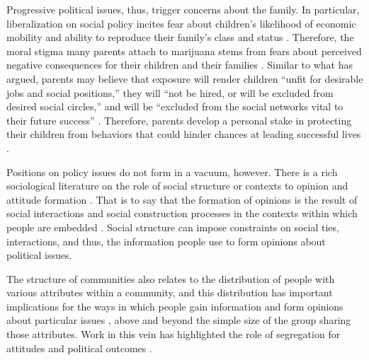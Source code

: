 Progressive political issues, thus, trigger concerns about the family. In particular, liberalization on social policy incites fear about children's likelihood of economic mobility and ability to reproduce their family's class and status \citep{beisel_1997,gusfield_1963,eskridge_and_speadle_2006}. Therefore, the moral stigma many parents attach to marijuana stems from fears about perceived negative consequences for their children and their families \citep{elder_and_greene_2019,lynskey_and_hall_2000,kandel_et_al_1986,lifrak_et_al_1997,fergusson_et_al_2002,kandel_2002,rosenthal_and_kubby_1996}. Similar to what \citet[5]{beisel_1997} has argued, parents may believe that exposure will render children ``unfit for desirable jobs and social positions,'' they will ``not be hired, or will be excluded from desired social circles,'' and will be ``excluded from the social networks vital to their future success'' \citep[199]{beisel_1997}. Therefore, parents develop a personal stake in protecting their children from behaviors that could hinder chances at leading successful lives \citep{beisel_1997,gusfield_1963}. 


Positions on policy issues do not form in a vacuum, however. There is a rich sociological literature on the role of social structure or contexts to opinion and attitude formation \citep{blau_1977a,blau_1977b,mcveigh_and_sobolewski_2007,mcveigh_and_diaz_2009}. That is to say that the formation of opinions is the result of social interactions and social construction processes in the contexts within which people are embedded \citep{mcveigh_and_sobolewski_2007,mcveigh_and_diaz_2009}. Social structure can impose constraints on social ties, interactions, and thus, the information people use to form opinions about political issues. 

The structure of communities also relates to the distribution of people with various attributes within a community, and this distribution has important implications for the ways in which people gain information and form opinions about particular issues  \citep{blau_1977b}, above and beyond the simple size of the group sharing those attributes. Work in this vein has highlighted the role of segregation for attitudes and political outcomes \citep{olzak_et_al_1994,andrews_and_seguin_2015}. 





